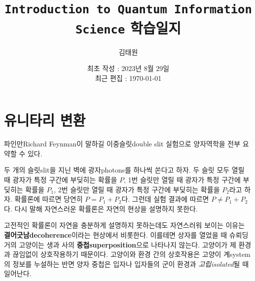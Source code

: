 \documentclass[a4paper,chapter,atbegshi]{oblivoir}
\title{\texttt{Introduction to Quantum Information Science} 학습일지}
\author{김태원}
\date{최초 작성 : 2023년 8월 29일 \\ 최근 편집 : \today}
\begin{document}
\maketitle
\break
\tableofcontents
\chapter{유니타리 변환}
파인만{\tiny Richard Feynman}이 말하길 이중슬릿{\tiny double slit} 실험으로
양자역학을 전부 요약할 수 있다.

두 개의 슬릿{\tiny slit}을 지닌 벽에 광자{\tiny photons}를 하나씩 쏜다고 하자.
두 슬릿 모두 열릴 때 광자가 특정 구간에 부딪히는 확률을 $P$, 1번 슬릿만
열릴 때 광자가 특정 구간에 부딪히는 확률을 $P_1$, 2번 슬릿만 열릴 때 광자가
특정 구간에 부딪히는 확률을 $P_2$라고 하자. 확률론에 따르면 당연히 $P=P_1+P_2$다.
그런데 실험 결과에 따르면 $P\neq P_1+P_2$다. 다시 말해 자연스러운 확률론은 자연의 
현상을 설명하지 못한다.

고전적인 확률론이 자연을 충분하게 설명하지 못하는데도 자연스러워 보이는 이유는 
\textbf{결어긋남\tiny decoherence}이라는 현상에서 비롯한다. 이를테면 상자를
열었을 때 슈뢰딩거의 고양이는 생과 사의 \textbf{중첩\tiny superposition}으로
나타나지 않는다. 고양이가 제 환경과 끊임없이 상호작용하기 때문이다. 고양이와
환경 간의 상호작용은 고양이 계{\tiny system}의 정보를 누설하는 반면 양자
중첩은 입자나 입자들의 군이 환경과 \emph{고립\tiny isolated}될 때 일어난다.
\end{document}

